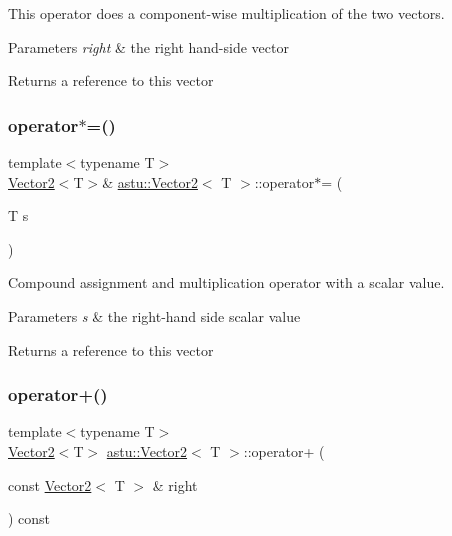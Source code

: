 This operator does a component-\/wise multiplication of the two vectors.


\begin{DoxyParams}{Parameters}
{\em right} & the right hand-\/side vector \\
\hline
\end{DoxyParams}
\begin{DoxyReturn}{Returns}
a reference to this vector 
\end{DoxyReturn}
\mbox{\label{classastu_1_1Vector2_a3a4e11dd85fbd0e1cda4e8b38b9aea6a}} 
\subsubsection{\texorpdfstring{operator$\ast$=()}{operator*=()}\hspace{0.1cm}{\footnotesize\ttfamily [2/2]}}
{\footnotesize\ttfamily template$<$typename T$>$ \\
\hyperlink{classastu_1_1Vector2}{Vector2}$<$T$>$\& \hyperlink{classastu_1_1Vector2}{astu\+::\+Vector2}$<$ T $>$\+::operator$\ast$= (\begin{DoxyParamCaption}\item[{T}]{s }\end{DoxyParamCaption})\hspace{0.3cm}{\ttfamily [inline]}}

Compound assignment and multiplication operator with a scalar value.


\begin{DoxyParams}{Parameters}
{\em s} & the right-\/hand side scalar value \\
\hline
\end{DoxyParams}
\begin{DoxyReturn}{Returns}
a reference to this vector 
\end{DoxyReturn}
\mbox{\label{classastu_1_1Vector2_a1ebf3c3f9ef6c8e07f6ea2327a630fca}} 
\subsubsection{\texorpdfstring{operator+()}{operator+()}}
{\footnotesize\ttfamily template$<$typename T$>$ \\
\hyperlink{classastu_1_1Vector2}{Vector2}$<$T$>$ \hyperlink{classastu_1_1Vector2}{astu\+::\+Vector2}$<$ T $>$\+::operator+ (\begin{DoxyParamCaption}\item[{const \hyperlink{classastu_1_1Vector2}{Vector2}$<$ T $>$ \&}]{right }\end{DoxyParamCaption}) const\hspace{0.3cm}{\ttfamily [inline]}}

